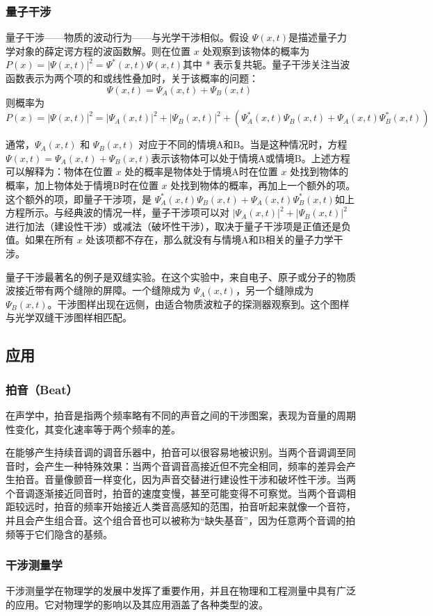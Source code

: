 \subsubsection{量子干涉}
量子干涉——物质的波动行为——与光学干涉相似。假设  \(\Psi(x,t)\)是描述量子力学对象的薛定谔方程的波函数解。则在位置 \(x\) 处观察到该物体的概率为 \(P(x) = |\Psi(x,t)|^2 = \Psi^*(x,t) \Psi(x,t)\)其中 * 表示复共轭。量子干涉关注当波函数表示为两个项的和或线性叠加时，关于该概率的问题：  
\[
\Psi(x,t) = \Psi_A(x,t) + \Psi_B(x,t)~
\]
则概率为  
\[
P(x) = |\Psi(x,t)|^2 = |\Psi_A(x,t)|^2 + |\Psi_B(x,t)|^2 + (\Psi_A^*(x,t) \Psi_B(x,t) + \Psi_A(x,t) \Psi_B^*(x,t))~
\]

通常，\(\Psi_A(x,t)\) 和 \(\Psi_B(x,t)\) 对应于不同的情境A和B。当是这种情况时，方程  \(\Psi(x,t) = \Psi_A(x,t) + \Psi_B(x,t)\)表示该物体可以处于情境A或情境B。上述方程可以解释为：物体在位置 \(x\) 处的概率是物体处于情境A时在位置 \(x\) 处找到物体的概率，加上物体处于情境B时在位置 \(x\) 处找到物体的概率，再加上一个额外的项。这个额外的项，即量子干涉项，是 \(\Psi_A^*(x,t) \Psi_B(x,t) + \Psi_A(x,t) \Psi_B^*(x,t)\)如上方程所示。与经典波的情况一样，量子干涉项可以对 \(|\Psi_A(x,t)|^2 + |\Psi_B(x,t)|^2\)进行加法（建设性干涉）或减法（破坏性干涉），取决于量子干涉项是正值还是负值。如果在所有 \(x\) 处该项都不存在，那么就没有与情境A和B相关的量子力学干涉。

量子干涉最著名的例子是双缝实验。在这个实验中，来自电子、原子或分子的物质波接近带有两个缝隙的屏障。一个缝隙成为 \(\Psi_A(x,t)\)，另一个缝隙成为 \(\Psi_B(x,t)\)。干涉图样出现在远侧，由适合物质波粒子的探测器观察到。这个图样与光学双缝干涉图样相匹配。
\subsection{应用}
\subsubsection{拍音（Beat）}
在声学中，拍音是指两个频率略有不同的声音之间的干涉图案，表现为音量的周期性变化，其变化速率等于两个频率的差。

在能够产生持续音调的调音乐器中，拍音可以很容易地被识别。当两个音调调至同音时，会产生一种特殊效果：当两个音调音高接近但不完全相同，频率的差异会产生拍音。音量像颤音一样变化，因为声音交替进行建设性干涉和破坏性干涉。当两个音调逐渐接近同音时，拍音的速度变慢，甚至可能变得不可察觉。当两个音调相距较远时，拍音的频率开始接近人类音高感知的范围，拍音听起来就像一个音符，并且会产生组合音。这个组合音也可以被称为“缺失基音”，因为任意两个音调的拍频等于它们隐含的基频。
\subsubsection{干涉测量学}
干涉测量学在物理学的发展中发挥了重要作用，并且在物理和工程测量中具有广泛的应用。它对物理学的影响以及其应用涵盖了各种类型的波。

